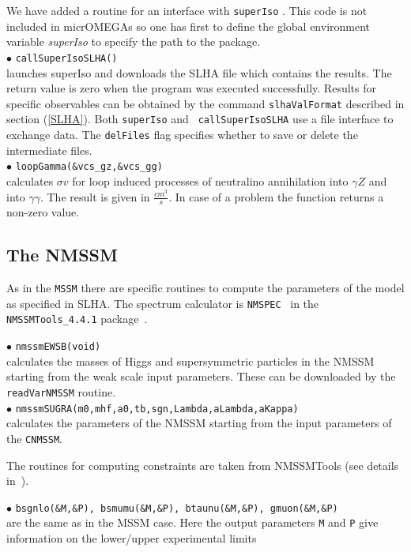 \documentclass[12pt,a4paper]{article}
\begin{document}
{We have added a routine for an interface with {\tt superIso}
\cite{Arbey:2011zz}. This code is not 
included in micrOMEGAs so one has first to define 
the global environment  variable {\it superIso} 
to specify the path to the package.\\ 
\noi$\bullet$ \verb|callSuperIsoSLHA()|\\
launches superIso and downloads the SLHA file which  contains the results. The
return value is zero when the program was  executed successfully.  Results
for specific  observables can be obtained by the command {\tt slhaValFormat}
described in  section (\ref{SLHA}).  Both {\tt superIso} and {\tt
callSuperIsoSLHA} use a file interface to exchange data. The {\tt delFiles} flag specifies whether
to save or delete the intermediate files.\\
\noi$\bullet$ \verb|loopGamma(&vcs_gz,&vcs_gg)|\\
calculates $\sigma v$ for  loop induced processes of neutralino
annihilation into $\gamma Z$ and into $\gamma \gamma$. The result is given in  
$\frac{cm^3}{s}$. In case of a problem the function returns a non-zero value. 

\subsection{The NMSSM}

As in the {\tt MSSM} there are specific routines to compute the  
parameters of the model as  specified in SLHA. The spectrum calculator is \verb|NMSPEC|~\cite{Ellwanger:2006rn}
 in the \verb|NMSSMTools_4.4.1| package~\cite{nmssmtools}.

\noindent$\bullet$ \verb|nmssmEWSB(void)|\\
calculates the masses of Higgs and supersymmetric particles in the NMSSM
starting from the weak scale input parameters. These  can be downloaded by the 
{\tt readVarNMSSM} routine.~\cite{Ellwanger:2005dv}\\   
\noindent$\bullet$ \verb|nmssmSUGRA(m0,mhf,a0,tb,sgn,Lambda,aLambda,aKappa)|\\
calculates the parameters of the NMSSM starting from the input parameters of 
the \verb|CNMSSM|.

The routines for computing constraints are taken from NMSSMTools (see details  in~\cite{Belanger:2006is}).

\noindent
$\bullet$ {\tt bsgnlo(\&M,\&P), bsmumu(\&M,\&P), btaunu(\&M,\&P),  gmuon(\&M,\&P)}\\ 
are the same as in the MSSM case.  Here the output parameters {\tt M} and {\tt P} 
give information on the lower/upper experimental limits ~\cite{Domingo:2007dx}



}
\end{document}
